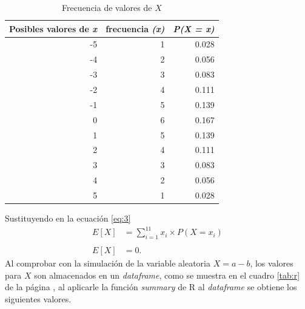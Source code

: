 \documentclass{article}
\begin{document}
\begin{table}[H]
  \centering
  \caption{Frecuencia de valores de $X$ }
    \begin{tabular}{rrr}
    \toprule
    \multicolumn{1}{p{5.39em}}{\textbf{Posibles valores de \textit{\textbf{x}}}} & \multicolumn{1}{l}{\textbf{frecuencia  \textit{\textbf{(x)}}}}  & \multicolumn{1}{l}{\textit{\textbf{P(X = x)}}} \\
    \midrule
    -5    & 1     & 0.028 \\
    -4    & 2     & 0.056 \\
    -3    & 3     & 0.083 \\
    -2    & 4     & 0.111 \\
    -1    & 5     & 0.139 \\
    0     & 6     & 0.167 \\
    1     & 5     & 0.139 \\
    2     & 4     & 0.111 \\
    3     & 3     & 0.083 \\
    4     & 2     & 0.056 \\
    5     & 1     & 0.028 \\
    \bottomrule
    \end{tabular}%
  \label{tab:2}%
\end{table}%
Sustituyendo en la ecuación \ref{eq:3}
\begin{equation}
\begin{array}{ll}
   E[X] &= \sum_{i=1}^{11} x_{i}  \times P(X=x_{i})\\
   &\\
   E[X] & = 0.
  \end{array}
\end{equation}
Al comprobar con la simulación de la variable aleatoria $X = a - b$, los valores para $X$ son almacenados en un \textit{dataframe}, como se muestra en el cuadro \ref{tab:r} de la página \pageref{tab:r}, al aplicarle la función \textit{summary} de R al \textit{dataframe} se obtiene los siguientes valores.  
\end{document}
